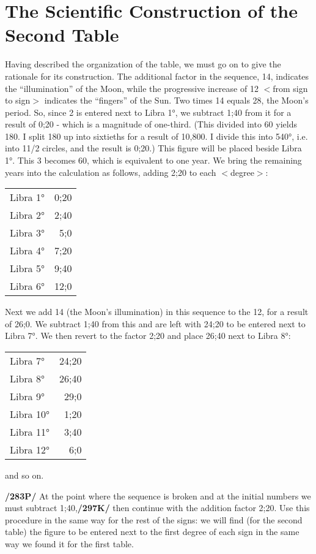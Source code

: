 \section{The Scientific Construction of the Second Table}

Having described the organization of the table, we must go on to give the rationale for its construction. The additional factor in the sequence, 14, indicates the “illumination” of the Moon, while the progressive
increase of 12 $<$from sign to sign$>$ indicates the “fingers” of the Sun. Two times 14 equals 28, the Moon’s period. So, since 2 is entered next to Libra 1°, we subtract 1;40 from it for a result of 0;20 - which is a magnitude of one-third. (This divided into 60 yields 180. I split 180 up into sixtieths for a result of 10,800. I divide this into 540°, i.e. into 11/2 circles, and the result is 0;20.) This figure will be placed beside Libra 1°. This 3 becomes 60, which is equivalent to one year. We bring the remaining years into the calculation as follows, adding 2;20 to each $<$degree$>$:

\begin{tabular}{lr}
Libra 1° & 0;20 \\
Libra 2° & 2;40 \\
Libra 3° & 5;0 \\
Libra 4° & 7;20 \\
Libra 5° & 9;40 \\
Libra 6° & 12;0 \\
\end{tabular}

Next we add 14 (the Moon’s illumination) in this sequence to the 12, for a result of 26;0. We subtract 1;40 from this and are left with 24;20 to be entered next to Libra 7°. We then revert to the factor 2;20 and place 26;40 next to Libra 8°:

\begin{tabular}{lr}
Libra 7° & 24;20 \\
Libra 8° & 26;40 \\
Libra 9° & 29;0 \\
Libra 10° & 1;20 \\
Libra 11° & 3;40 \\
Libra 12° & 6;0 \\
\end{tabular}

and so on.

\textbf{/283P/} At the point where the sequence is broken and at the initial numbers we must subtract 1;40,\textbf{/297K/} then continue with the addition factor 2;20. Use this procedure in the same way for the rest of the signs: we will find (for the second table) the figure to be entered next to the first degree of each sign in the same way we found it for the first table.
\newpage